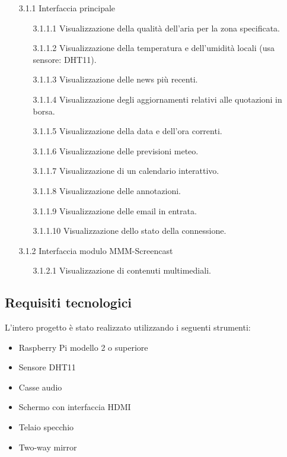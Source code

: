 \documentclass[a4paper,11pt]{article}       %
\begin{document}
        \begin{itemize}
            \item[3.1.1] Interfaccia principale
                \begin{itemize}
                    \item[3.1.1.1] Visualizzazione della qualità dell'aria per la zona specificata.
                    \item[3.1.1.2] Visualizzazione della temperatura e dell'umidità locali (usa sensore: DHT11).
                    \item[3.1.1.3] Visualizzazione delle news più recenti.
                    \item[3.1.1.4] Visualizzazione degli aggiornamenti relativi alle quotazioni in borsa.
                    \item[3.1.1.5] Visualizzazione della data e dell'ora correnti.
                    \item[3.1.1.6] Visualizzazione delle previsioni meteo.
                    \item[3.1.1.7] Visualizzazione di un calendario interattivo.
                    \item[3.1.1.8] Visualizzazione delle annotazioni.
                    \item[3.1.1.9] Visualizzazione delle email in entrata.
                    \item[3.1.1.10] Visualizzazione dello stato della connessione.
                \end{itemize}   
                
            \item[3.1.2] Interfaccia modulo MMM-Screencast
                \begin{itemize}
                    \item[3.1.2.1] Visualizzazione di contenuti multimediali.
                \end{itemize}
        \end{itemize}
    
    \subsection{Requisiti tecnologici}
        L'intero progetto è stato realizzato utilizzando i seguenti strumenti:
        \begin{itemize}
            \item Raspberry Pi modello 2 o superiore
            \item Sensore DHT11
            \item Casse audio
            \item Schermo con interfaccia HDMI
            \item Telaio specchio
            \item \gls{Two-way mirror}
        \end{itemize}
        
\end{document}
